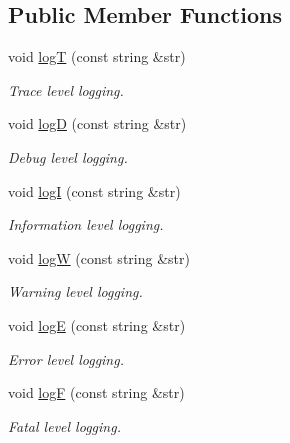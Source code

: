 \subsection*{Public Member Functions}
\begin{DoxyCompactItemize}
\item 
void \hyperlink{classit_1_1testbench_1_1logger_1_1RawLogger_a85e039010f6fadb64ad0eeab0d2a9116}{log\-T} (const string \&str)
\begin{DoxyCompactList}\small\item\em Trace level logging. \end{DoxyCompactList}\item 
void \hyperlink{classit_1_1testbench_1_1logger_1_1RawLogger_adbbe4c396320a0526045c783e0e934bb}{log\-D} (const string \&str)
\begin{DoxyCompactList}\small\item\em Debug level logging. \end{DoxyCompactList}\item 
void \hyperlink{classit_1_1testbench_1_1logger_1_1RawLogger_ab5d9d624a642d5ec8bf353aeffa0d86f}{log\-I} (const string \&str)
\begin{DoxyCompactList}\small\item\em Information level logging. \end{DoxyCompactList}\item 
void \hyperlink{classit_1_1testbench_1_1logger_1_1RawLogger_a6257a59594ebdd57988d98c27663d8a1}{log\-W} (const string \&str)
\begin{DoxyCompactList}\small\item\em Warning level logging. \end{DoxyCompactList}\item 
void \hyperlink{classit_1_1testbench_1_1logger_1_1RawLogger_a41a44127510c38b295ae6e1798a793a0}{log\-E} (const string \&str)
\begin{DoxyCompactList}\small\item\em Error level logging. \end{DoxyCompactList}\item 
void \hyperlink{classit_1_1testbench_1_1logger_1_1RawLogger_aac44d30e776d18fcc637814cfa35b336}{log\-F} (const string \&str)
\begin{DoxyCompactList}\small\item\em Fatal level logging. \end{DoxyCompactList}\end{DoxyCompactItemize}
